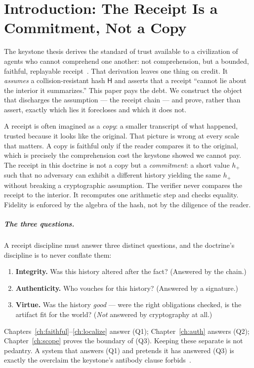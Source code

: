 \documentclass[11pt,oneside]{book}
\theoremstyle{definition}
\theoremstyle{plain}
\theoremstyle{remark}
\newcommand{\chainH}{\mathsf{H}}               %
\begin{document}
\tableofcontents

\mainmatter

\chapter{Introduction: The Receipt Is a Commitment, Not a Copy}
\label{ch:intro}

The keystone thesis derives the standard of trust available to a civilization of agents who
cannot comprehend one another: not comprehension, but a bounded, faithful, replayable
receipt~\cite{chatman2025}. That derivation leaves one thing on credit. It \emph{assumes} a
collision-resistant hash $\chainH$ and asserts that a receipt ``cannot lie about the interior
it summarizes.'' This paper pays the debt. We construct the object that discharges the
assumption --- the receipt chain --- and prove, rather than assert, exactly which lies it
forecloses and which it does not.

A receipt is often imagined as a \emph{copy}: a smaller transcript of what happened, trusted
because it looks like the original. That picture is wrong at every scale that matters. A copy
is faithful only if the reader compares it to the original, which is precisely the
comprehension cost the keystone showed we cannot pay. The receipt in this doctrine is not a
copy but a \emph{commitment}: a short value $h_{+}$ such that no adversary can exhibit a
different history yielding the same $h_{+}$ without breaking a cryptographic assumption. The
verifier never compares the receipt to the interior. It recomputes one arithmetic step and
checks equality. Fidelity is enforced by the algebra of the hash, not by the diligence of the
reader.

\paragraph{The three questions.} A receipt discipline must answer three distinct questions,
and the doctrine's discipline is to never conflate them:
\begin{enumerate}[label=(Q\arabic*),leftmargin=*]
\item \textbf{Integrity.} Was this history altered after the fact? (Answered by the chain.)
\item \textbf{Authenticity.} Who vouches for this history? (Answered by a signature.)
\item \textbf{Virtue.} Was the history \emph{good} --- were the right obligations checked, is
the artifact fit for the world? (\emph{Not} answered by cryptography at all.)
\end{enumerate}
Chapters~\ref{ch:faithful}--\ref{ch:localize} answer (Q1); Chapter~\ref{ch:auth} answers
(Q2); Chapter~\ref{ch:scope} proves the boundary of (Q3). Keeping these separate is not
pedantry. A system that answers (Q1) and pretends it has answered (Q3) is exactly the
overclaim the keystone's antibody clause forbids~\cite{chatman2025}.
\end{document}
